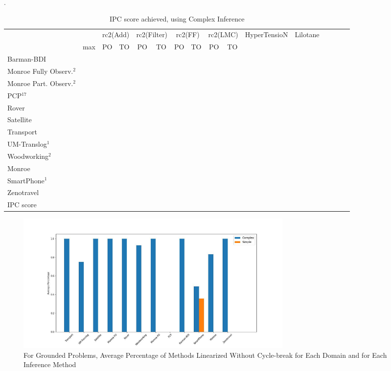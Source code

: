 \documentclass[letterpaper]{article} %
\begin{document}
\begin{table}
	\centering
	\caption{IPC score achieved, using Complex Inference}
	\label{table:GroundedComplexIPC}.
	\scalebox{0.8} {
		\begin{tabular}{lccccccccccccccccl} 
			\toprule 
&& \multicolumn{2}{c}{rc2(Add)} & \multicolumn{2}{c}{rc2(Filter)} & \multicolumn{2}{c}{rc2(FF)} & \multicolumn{2}{c}{rc2(LMC)} & \multicolumn{2}{c}{HyperTensioN} & \multicolumn{2}{c}{Lilotane} \\ 
\cmidrule(lr){3-4} \cmidrule(lr){5-6} \cmidrule(lr){7-8} \cmidrule(lr){9-10}   \cmidrule(lr){11-12} \cmidrule(lr){13-14}  
& max &PO & TO & PO & TO & PO & TO & PO & TO \\ 
\midrule 
Barman-BDI  \\ 
Monroe Fully Observ.$^{2}$   \\ 
Monroe Part. Observ.$^{2}$  \\ 
PCP$^{17}$  \\ 
Rover  \\ 
Satellite   \\  
Transport   \\ 
UM-Translog$^{1}$  \\ 
Woodworking$^{2}$  \\ 
\midrule 
Monroe   \\ 
SmartPhone$^{1}$   \\ 
Zenotravel   \\ 
\midrule 
IPC score \\
\bottomrule 
\end{tabular}  
	}
\end{table}







\begin{figure}
	\caption{For Grounded Problems, Average Percentage of Methods Linearized Without Cycle-break for Each Domain and for Each Inference Method}
	\label{fig:MethodsLinearizedWOCycleBreak}
	\centering
	\includegraphics[width=14cm]{figures/Lin_average_C_vs_S.jpg}
\end{figure} 
\end{document}
